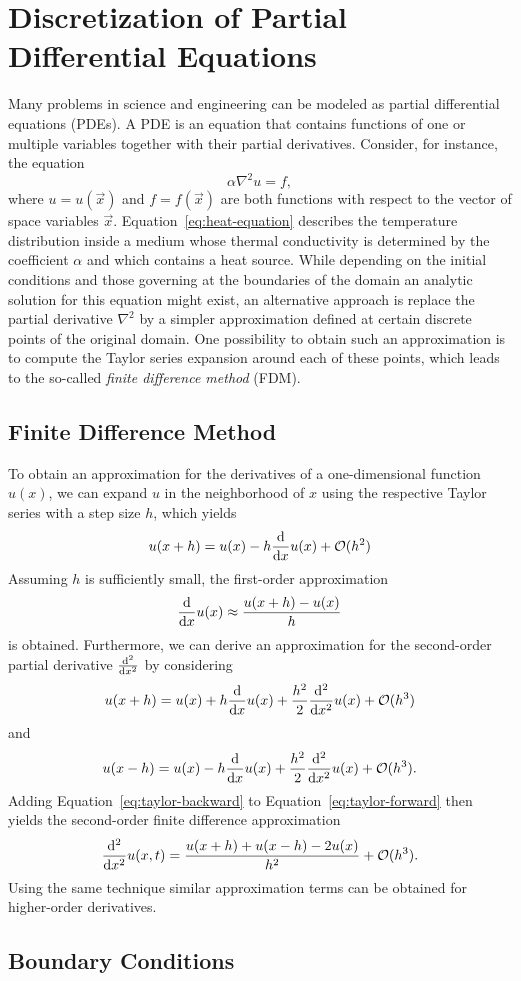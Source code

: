 \section{Discretization of Partial Differential Equations}
Many problems in science and engineering can be modeled as partial differential equations (PDEs). %
A PDE is an equation that contains functions of one or multiple variables together with their partial derivatives.
Consider, for instance, the equation
\begin{equation}
	\alpha \nabla^2 u = f,
	\label{eq:heat-equation}
\end{equation}
where $u = u(\vec{x})$ and $f = f(\vec{x})$ are both functions with respect to the vector of space variables $\vec{x}$.
Equation~\eqref{eq:heat-equation} describes the temperature distribution inside a medium whose thermal conductivity is determined by the coefficient $\alpha$ and which contains a heat source.
While depending on the initial conditions and those governing at the boundaries of the domain an analytic solution for this equation might exist, an alternative approach is replace the partial derivative $\nabla^2$ by a simpler approximation defined at certain discrete points of the original domain.
One possibility to obtain such an approximation is to compute the Taylor series expansion around each of these points, which leads to the so-called \emph{finite difference method} (FDM).
\subsection{Finite Difference Method}
To obtain an approximation for the derivatives of a one-dimensional function $u(x)$, we can expand $u$ in the neighborhood of $x$ using the respective Taylor series with a step size $h$, which yields
\begin{equation}
	u(x + h) = u(x) - h \dv{x} u(x) + \mathcal{O}(h^2)
\end{equation}
Assuming $h$ is sufficiently small, the first-order approximation 
\begin{equation}
	\dv{x} u(x) \approx \frac{u(x + h) -  u(x)}{h}
\end{equation}
is obtained.
Furthermore, we can derive an approximation for the second-order partial derivative $\dv[2]{x}$ by considering
\begin{equation}
	u(x + h) = u(x) + h \dv{x} u(x) + \frac{h^2}{2} \dv[2]{x} u(x) + \mathcal{O}(h^3)
	\label{eq:taylor-forward}
\end{equation}
and 
\begin{equation}
	u(x - h) = u(x) - h \dv{x} u(x) + \frac{h^2}{2} \dv[2]{x} u(x) + \mathcal{O}(h^3).
	\label{eq:taylor-backward}
\end{equation}
Adding Equation~\eqref{eq:taylor-backward} to Equation~\eqref{eq:taylor-forward} then yields the second-order finite difference approximation
\begin{equation}
	 \dv[2]{x} u(x,t) = \frac{u(x + h) + u(x - h) - 2u(x)}{h^2} + \mathcal{O}(h^3).
\end{equation}
Using the same technique similar approximation terms can be obtained for higher-order derivatives. %
\subsection{Boundary Conditions}




